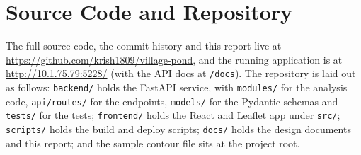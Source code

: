 \documentclass[manuscript,screen]{acmart}
\begin{document}
\section{Source Code and Repository}
The full source code, the commit history and this report live at
\url{https://github.com/krish1809/village-pond}, and the running application is at
\url{http://10.1.75.79:5228/} (with the API docs at \texttt{/docs}). The repository
is laid out as follows: \texttt{backend/} holds the FastAPI service, with
\texttt{modules/} for the analysis code, \texttt{api/routes/} for the endpoints,
\texttt{models/} for the Pydantic schemas and \texttt{tests/} for the tests;
\texttt{frontend/} holds the React and Leaflet app under \texttt{src/};
\texttt{scripts/} holds the build and deploy scripts; \texttt{docs/} holds the
design documents and this report; and the sample contour file sits at the project
root.
\end{document}
